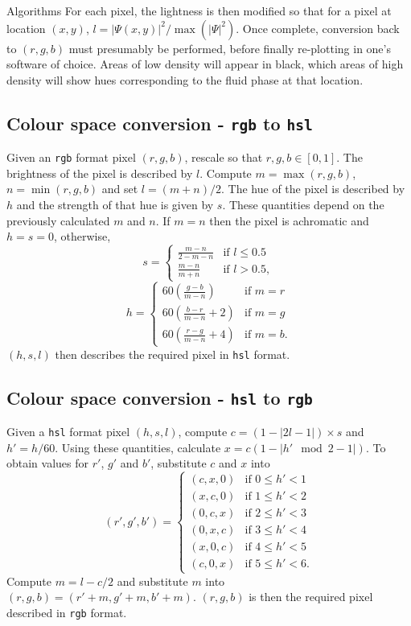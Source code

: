\begin{chapter}{\label{app:algorithms}Algorithms}
For each pixel, the lightness is then modified so that for a pixel at location $(x,y)$, $l = |\Psi(x,y)|^2/\max(|\Psi|^2)$. Once complete, conversion back to $(r,g,b)$ must presumably be performed, before finally re-plotting in one's software of choice. Areas of low density will appear in black, which areas of high density will show hues corresponding to the fluid phase at that location.

\subsection{Colour space conversion - {\tt rgb} to {\tt hsl}}
Given an {\tt rgb} format pixel $(r,g,b)$, rescale so that $r,g,b \in [0,1]$. The brightness of the pixel is described by $l$. Compute $m = \max(r,g,b)$, $n = \min(r,g,b)$ and set $l = (m+n)/2$. The hue of the pixel is described by $h$ and the strength of that hue is given by $s$. These quantities depend on the previously calculated $m$ and $n$. If $m=n$ then the pixel is achromatic and $h=s=0$, otherwise,
\begin{equation}
s =
    \begin{cases}
      \frac{m-n}{2 - m - n} &\mbox{if } l \leq 0.5 \\
      \frac{m-n}{m+n} &\mbox{if } l > 0.5,
    \end{cases}
\end{equation}
\begin{equation}
h =
    \begin{cases}
      60(\frac{g-b}{m-n}) &\mbox{if } m=r \\
      60(\frac{b-r}{m-n}+2) &\mbox{if } m=g \\
      60(\frac{r-g}{m-n}+4) &\mbox{if } m=b.
    \end{cases}
\end{equation}
$(h,s,l)$ then describes the required pixel in {\tt hsl} format.

\subsection{Colour space conversion - {\tt hsl} to {\tt rgb}}
Given a {\tt hsl} format pixel $(h,s,l)$, compute $c = (1 - | 2l - 1|) \times s$ and $h' = h/60$. Using these quantities, calculate $x = c(1-|h' \mod 2 - 1|)$. To obtain values for $r'$, $g'$ and $b'$, substitute $c$ and $x$ into
\begin{equation}
(r', g', b') =
    \begin{cases}
      (c, x, 0) &\mbox{if } 0 \leq h' < 1 \\
      (x, c, 0) &\mbox{if } 1 \leq h' < 2 \\
      (0, c, x) &\mbox{if } 2 \leq h' < 3 \\
      (0, x, c) &\mbox{if } 3 \leq h' < 4 \\
      (x, 0, c) &\mbox{if } 4 \leq h' < 5 \\
      (c, 0, x) &\mbox{if } 5 \leq h'< 6.
    \end{cases}
\end{equation}
Compute $m = l - c/2$ and substitute $m$ into $(r,g,b) = (r'+m,g'+m,b'+m)$. $(r,g,b)$ is then the required pixel described in {\tt rgb} format.


\end{chapter}
